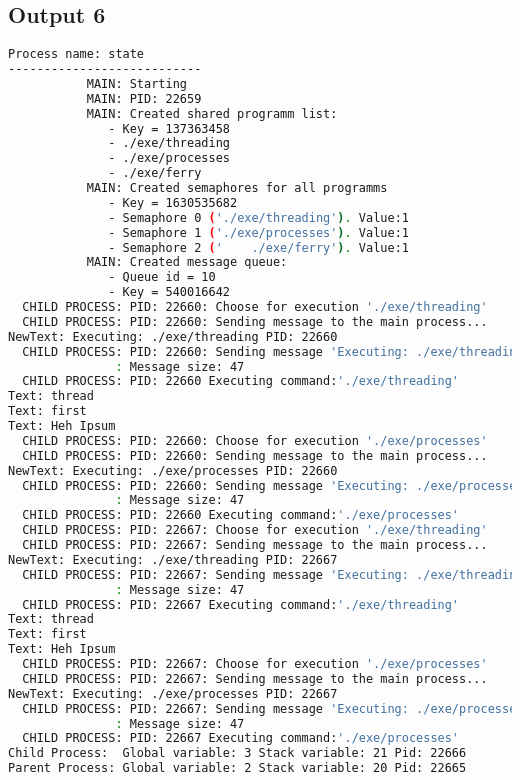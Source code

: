 \documentclass{article}
\begin{document}
\subsection{Output 6}
\begin{lstlisting}[language=BASH]
   Process name: state
---------------------------
           MAIN: Starting
           MAIN: PID: 22659
           MAIN: Created shared programm list:
              - Key = 137363458
              - ./exe/threading
              - ./exe/processes
              - ./exe/ferry
           MAIN: Created semaphores for all programms
              - Key = 1630535682
              - Semaphore 0 ('./exe/threading'). Value:1
              - Semaphore 1 ('./exe/processes'). Value:1
              - Semaphore 2 ('    ./exe/ferry'). Value:1
           MAIN: Created message queue:
              - Queue id = 10
              - Key = 540016642
  CHILD PROCESS: PID: 22660: Choose for execution './exe/threading'
  CHILD PROCESS: PID: 22660: Sending message to the main process...
NewText: Executing: ./exe/threading PID: 22660
  CHILD PROCESS: PID: 22660: Sending message 'Executing: ./exe/threading PID: 22660' to the MAIN process...
               : Message size: 47
  CHILD PROCESS: PID: 22660 Executing command:'./exe/threading'
Text: thread
Text: first
Text: Heh Ipsum
  CHILD PROCESS: PID: 22660: Choose for execution './exe/processes'
  CHILD PROCESS: PID: 22660: Sending message to the main process...
NewText: Executing: ./exe/processes PID: 22660
  CHILD PROCESS: PID: 22660: Sending message 'Executing: ./exe/processes PID: 22660' to the MAIN process...
               : Message size: 47
  CHILD PROCESS: PID: 22660 Executing command:'./exe/processes'
  CHILD PROCESS: PID: 22667: Choose for execution './exe/threading'
  CHILD PROCESS: PID: 22667: Sending message to the main process...
NewText: Executing: ./exe/threading PID: 22667
  CHILD PROCESS: PID: 22667: Sending message 'Executing: ./exe/threading PID: 22667' to the MAIN process...
               : Message size: 47
  CHILD PROCESS: PID: 22667 Executing command:'./exe/threading'
Text: thread
Text: first
Text: Heh Ipsum
  CHILD PROCESS: PID: 22667: Choose for execution './exe/processes'
  CHILD PROCESS: PID: 22667: Sending message to the main process...
NewText: Executing: ./exe/processes PID: 22667
  CHILD PROCESS: PID: 22667: Sending message 'Executing: ./exe/processes PID: 22667' to the MAIN process...
               : Message size: 47
  CHILD PROCESS: PID: 22667 Executing command:'./exe/processes'
Child Process:  Global variable: 3 Stack variable: 21 Pid: 22666
Parent Process: Global variable: 2 Stack variable: 20 Pid: 22665

\end{lstlisting}
\end{document}
